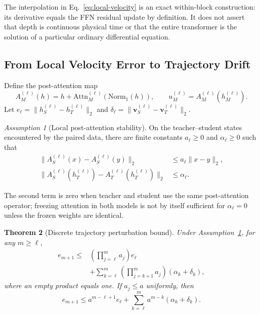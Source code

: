 \documentclass{article}
\newcommand{\Attn}{\mathrm{Attn}}
\newcommand{\Norm}{\mathrm{Norm}}
\newcommand{\bv}{\boldsymbol{v}}
\theoremstyle{plain}
\newtheorem{theorem}{Theorem}
\theoremstyle{definition}
\theoremstyle{remark}
\newtheorem{assumption}[theorem]{Assumption}
\begin{document}
The interpolation in Eq.~\eqref{eq:local-velocity} is an exact within-block
construction: its derivative equals the FFN residual update by definition.  It
does not assert that depth is continuous physical time or that the entire
transformer is the solution of a particular ordinary differential equation.

\subsection{From Local Velocity Error to Trajectory Drift}
\label{app:trajectory-stability}

Define the post-attention map
\begin{equation}
  A_M^{(\ell)}(h)
  =h+\Attn_M^{(\ell)}\!\left(\Norm_1(h)\right),
  \qquad u_M^{(\ell)}=A_M^{(\ell)}(h_M^{(\ell)}).
  \label{eq:app-post-attention-map}
\end{equation}
Let
$e_\ell=\|h_S^{(\ell)}-h_T^{(\ell)}\|_2$ and
$\delta_\ell=\|\bv_S^{(\ell)}-\bv_T^{(\ell)}\|_2$.

\begin{assumption}[Local post-attention stability]
\label{ass:app-attention-stability}
On the teacher--student states encountered by the paired data, there are finite
constants $a_\ell\ge0$ and $\alpha_\ell\ge0$ such that
\begin{equation}
\begin{aligned}
  \|A_S^{(\ell)}(x)-A_S^{(\ell)}(y)\|_2
  &\le a_\ell\|x-y\|_2,\\
  \|A_S^{(\ell)}(h_T^{(\ell)})-
  A_T^{(\ell)}(h_T^{(\ell)})\|_2
  &\le\alpha_\ell.
  \label{eq:app-attention-stability-assumption}
\end{aligned}
\end{equation}
\end{assumption}
The second term is zero when teacher and student use the same post-attention
operator; freezing attention in both models is not by itself sufficient for
$\alpha_\ell=0$ unless the frozen weights are identical.

\begin{theorem}[Discrete trajectory perturbation bound]
\label{thm:app-trajectory-bound}
Under Assumption~\ref{ass:app-attention-stability}, for any $m\ge\ell$,
\begin{equation}
\begin{aligned}
  e_{m+1}
  \le&\left(\prod_{j=\ell}^{m}a_j\right)e_\ell\\
  &+\sum_{k=\ell}^{m}
  \left(\prod_{j=k+1}^{m}a_j\right)
  \left(\alpha_k+\delta_k\right),
  \label{eq:app-discrete-gronwall}
\end{aligned}
\end{equation}
where an empty product equals one.  If $a_j\le a$ uniformly, then
\begin{equation}
  e_{m+1}\le a^{m-\ell+1}e_\ell
  +\sum_{k=\ell}^{m}a^{m-k}(\alpha_k+\delta_k).
  \label{eq:app-uniform-trajectory-bound}
\end{equation}
\end{theorem}
\end{document}
